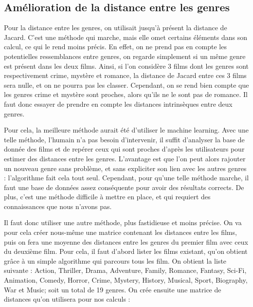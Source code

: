 \documentclass{report}
\begin{document}
\subsection{Amélioration de la distance entre les genres}
Pour la distance entre les genres, on utilisait jusqu'à présent la distance de Jacard. C'est une méthode qui marche, mais elle omet certains éléments dans son calcul, ce qui le rend moins précis. En effet, on ne prend pas en compte les potentielles ressemblances entre genres, on regarde simplement si un même genre est présent dans les deux films. Ainsi, si l'on considère 3 films dont les genres sont respectivement crime, mystère et romance, la distance de Jacard entre ces 3 films sera nulle, et on ne pourra pas les classer. Cependant, on se rend bien compte que les genres crime et mystère sont proches, alors qu'ils ne le sont pas de romance. Il faut donc essayer de prendre en compte les distances intrinsèques entre deux genres.\par
Pour cela, la meilleure méthode aurait été d'utiliser le machine learning. Avec une telle méthode, l'humain n'a pas besoin d'intervenir, il suffit d'analyser la base de donnée des films et de repérer ceux qui sont proches d'après les utilisateurs pour estimer des distances entre les genres. L'avantage est que l'on peut alors rajouter un nouveau genre sans problème, et sans expliciter son lien avec les autres genres : l'algorithme fait cela tout seul. Cependant, pour qu'une telle méthode marche, il faut une base de données assez conséquente pour avoir des résultats corrects. De plus, c'est une méthode difficile à mettre en place, et qui requiert des connaissances que nous n'avons pas.\par
Il faut donc utiliser une autre méthode, plus fastidieuse et moins précise. On va pour cela créer nous-même une matrice contenant les distances entre les films, puis on fera une moyenne des distances entre les genres du premier film avec ceux du deuxième film. Pour cela, il faut d'abord lister les films existant, qu'on obtient grâce à un simple algorithme qui parcours tous les film. On obtient la liste suivante : Action, Thriller, Drama, Adventure, Family, Romance, Fantasy, Sci-Fi, Animation, Comedy, Horror, Crime, Mystery, History, Musical, Sport, Biography, War et Music; soit un total de 19 genres. On crée ensuite une matrice de distances qu'on utilisera pour nos calculs :
\setcounter{MaxMatrixCols}{20}
\small
\end{document}
